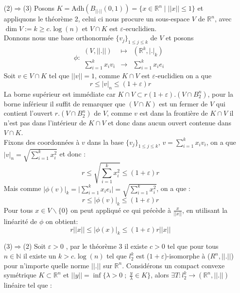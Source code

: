 \documentclass{report}
\begin{document}
\begin{enumerate}[leftmargin=\labelsep]
	\item[(2)$\Rightarrow$(3)]
	Posons $K=\text{Adh}(B_{||.||}(0,1))=\{x\in  \mathbb{R}^n \; | \; ||x||\leq 1 \}$ et appliquons le théorème 2, celui ci nous procure un sous-espace $V$ de $\mathbb{R}^n$, avec $\dim V := k \geq c.\log(n)$ et $V\cap K$ est $\varepsilon\text{-ecuclidien}$.\\
	Donnons nous une base orthonormée $\{v_j\}_{1\leq j \leq k}$ de $V$ et posons 
	\begin{equation*}
	\phi :\begin{array}{ccc}
	(V,||.||) & \mapsto &(\mathbb{R}^k,|.|_k) \\
	\sum_{i=1}^{k}x_i v_i & \to & \sum_{i=1}^{k}x_i e_i
	\end{array}
	\end{equation*}
	Soit $v\in V\cap K$ tel que $||v||=1$, comme $K\cap V$ est $\varepsilon$-euclidien on a que 
	\begin{equation*}
	r \leq |v|_n \leq (1+\varepsilon)r
	\end{equation*}
	La borne supérieur est immédiate car  $K\cap V \subset r(1+\varepsilon).(V\cap B^n_2)$, pour la borne inférieur il suffit de remarquer que $(V\cap K)$ est un fermer de $V$ qui contient l'ouvert $r.(V\cap B^n_2)$ de $V$, comme $v$ est dans la frontière de $K\cap V$ il n'est pas dans l'intérieur de $K\cap V$ et donc dans aucun ouvert contenue dans $V\cap K$.\\
	Fixons des coordonnées à $v$ dans la base $\{v_j\}_{1\leq j \leq k}$, $v = \sum_{i=1}^{k}x_iv_i$, on a que $|v|_n = \sqrt{\sum_{i=1}^{k}x_i^2}$ et donc :
	\begin{equation*}
	r \leq \sqrt{\sum_{i=1}^{k}x_i^2} \leq (1+\varepsilon)r
	\end{equation*}
	Mais comme $|\phi(v)|_k = \big|\sum_{i=1}^{k}x_i e_i \big| = \sqrt{\sum_{i=1}^{k}x_i^2}$, on a que :
	\begin{equation*}
	r \leq |\phi(v)|_k \leq (1+\varepsilon)r
	\end{equation*}
	Pour tous $x\in  V\backslash\{0\}$ on peut appliqué ce qui précède à $\frac{x}{||x||}$, en utilisant la linéarité de $\phi$ on obtient:
	\begin{equation*}
	r||x||  \leq |\phi(x)|_k \leq (1+\varepsilon)r ||x||
	\end{equation*}
	\item[(3)$\Rightarrow$(2)]
	Soit $\varepsilon>0$ , par le théorème 3 il existe $c>0$ tel que pour tous $n\in\mathbb{N}$ il existe un $k>c.\log(n)$ tel que $l_2^k$ est ($1+\varepsilon$)-isomorphe à ($R^n,||.||$) pour n’importe quelle norme $||.||$ sur $\mathbb{R}^n$. Considérons un compact convexe symétrique $K\subset \mathbb{R}^n$ et $||y||=\inf\Big\{\lambda>0\; ;\; \frac{y}{\lambda}\in K\Big\}$, alors $\exists T :l^{k}_2\to(\mathbb{R}^n,||.||)$ linéaire tel que :

\end{enumerate}
\end{document}
